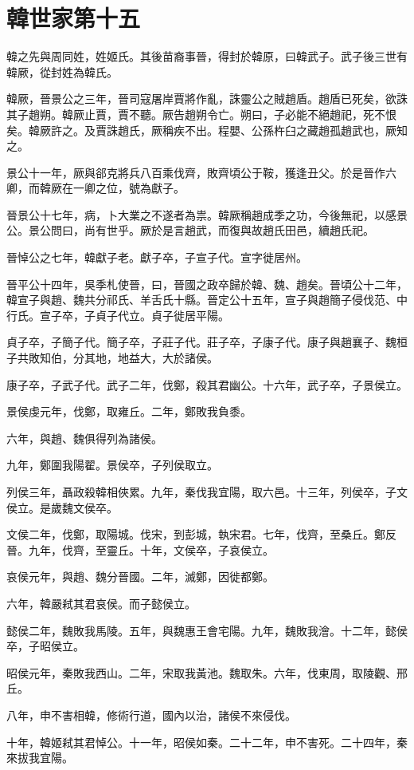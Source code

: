 \chapter{韓世家第十五}

韓之先與周同姓，姓姬氏。其後苗裔事晉，得封於韓原，曰韓武子。武子後三世有韓厥，從封姓為韓氏。

韓厥，晉景公之三年，晉司寇屠岸賈將作亂，誅靈公之賊趙盾。趙盾已死矣，欲誅其子趙朔。韓厥止賈，賈不聽。厥告趙朔令亡。朔曰，子必能不絕趙祀，死不恨矣。韓厥許之。及賈誅趙氏，厥稱疾不出。程嬰、公孫杵臼之藏趙孤趙武也，厥知之。

景公十一年，厥與郤克將兵八百乘伐齊，敗齊頃公于鞍，獲逢丑父。於是晉作六卿，而韓厥在一卿之位，號為獻子。

晉景公十七年，病，卜大業之不遂者為祟。韓厥稱趙成季之功，今後無祀，以感景公。景公問曰，尚有世乎。厥於是言趙武，而復與故趙氏田邑，續趙氏祀。

晉悼公之七年，韓獻子老。獻子卒，子宣子代。宣字徙居州。

晉平公十四年，吳季札使晉，曰，晉國之政卒歸於韓、魏、趙矣。晉頃公十二年，韓宣子與趙、魏共分祁氏、羊舌氏十縣。晉定公十五年，宣子與趙簡子侵伐范、中行氏。宣子卒，子貞子代立。貞子徙居平陽。

貞子卒，子簡子代。簡子卒，子莊子代。莊子卒，子康子代。康子與趙襄子、魏桓子共敗知伯，分其地，地益大，大於諸侯。

康子卒，子武子代。武子二年，伐鄭，殺其君幽公。十六年，武子卒，子景侯立。

景侯虔元年，伐鄭，取雍丘。二年，鄭敗我負黍。

六年，與趙、魏俱得列為諸侯。

九年，鄭圍我陽翟。景侯卒，子列侯取立。

列侯三年，聶政殺韓相俠累。九年，秦伐我宜陽，取六邑。十三年，列侯卒，子文侯立。是歲魏文侯卒。

文侯二年，伐鄭，取陽城。伐宋，到彭城，執宋君。七年，伐齊，至桑丘。鄭反晉。九年，伐齊，至靈丘。十年，文侯卒，子哀侯立。

哀侯元年，與趙、魏分晉國。二年，滅鄭，因徙都鄭。

六年，韓嚴弒其君哀侯。而子懿侯立。

懿侯二年，魏敗我馬陵。五年，與魏惠王會宅陽。九年，魏敗我澮。十二年，懿侯卒，子昭侯立。

昭侯元年，秦敗我西山。二年，宋取我黃池。魏取朱。六年，伐東周，取陵觀、邢丘。

八年，申不害相韓，修術行道，國內以治，諸侯不來侵伐。

十年，韓姬弒其君悼公。十一年，昭侯如秦。二十二年，申不害死。二十四年，秦來拔我宜陽。

